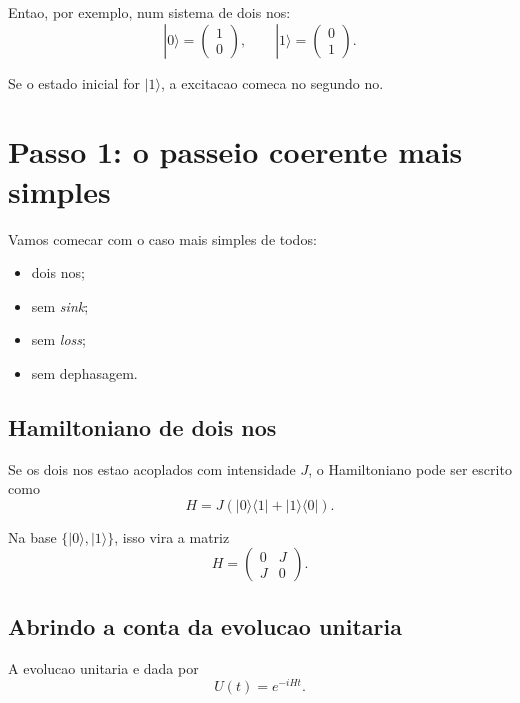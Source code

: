 \documentclass[11pt,a4paper]{article}
\begin{document}
Entao, por exemplo, num sistema de dois nos:
\begin{equation}
|0\rangle =
\begin{pmatrix}
1 \\ 0
\end{pmatrix},
\qquad
|1\rangle =
\begin{pmatrix}
0 \\ 1
\end{pmatrix}.
\end{equation}

Se o estado inicial for $|1\rangle$, a excitacao comeca no segundo no.

\section{Passo 1: o passeio coerente mais simples}

Vamos comecar com o caso mais simples de todos:
\begin{itemize}
  \item dois nos;
  \item sem \emph{sink};
  \item sem \emph{loss};
  \item sem dephasagem.
\end{itemize}

\subsection{Hamiltoniano de dois nos}

Se os dois nos estao acoplados com intensidade $J$, o Hamiltoniano pode ser
escrito como
\begin{equation}
H =
J\left(|0\rangle\langle 1| + |1\rangle\langle 0|\right).
\end{equation}

Na base $\{|0\rangle,|1\rangle\}$, isso vira a matriz
\begin{equation}
H =
\begin{pmatrix}
0 & J \\
J & 0
\end{pmatrix}.
\end{equation}

\subsection{Abrindo a conta da evolucao unitaria}

A evolucao unitaria e dada por
\begin{equation}
U(t)=e^{-iHt}.
\end{equation}
\end{document}
